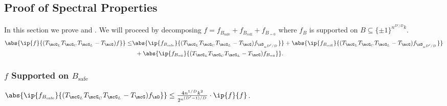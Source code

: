 \subsection{Proof of Spectral Properties}\label{sec:genspectral}

In this section we prove  and . We will proceed by decomposing $f = f_{B_{\mathrm{safe}}} + f_{B_{\mathrm{coll}}} + f_{B_{=0}}$ where $f_B$ is supported on $B \subseteq \{\pm1\}^{n^{D'/D}k}$.
\begin{align*}
    \abs{\ip{f}{(T_{\mcG_L}T_{\mcG_C}T_{\mcG_L} - T_\mcG) f}} \leq &\abs{\ip{f_{B_{\mathrm{safe}}}}{(T_{\mcG_L}T_{\mcG_C}T_{\mcG_L} - T_\mcG) f_{\sD_{n^{D'/D}}}}}
    + \abs{\ip{f_{B_{\mathrm{coll}}}}{(T_{\mcG_L}T_{\mcG_C}T_{\mcG_L} - T_\mcG) f_{\sD_{n^{D'/D}}}}}\\
    &\;\;+ \abs{\ip{f_{B_{=0}}}{(T_{\mcG_L}T_{\mcG_C}T_{\mcG_L} - T_\mcG) f_{B_{=0}}}}.
\end{align*}

\subsubsection{$f$ Supported on $B_{\mathrm{safe}}$}

\begin{lemma}
    $\abs{\ip{f_{B_{\mathrm{safe}}}}{(T_{\mcG_L}T_{\mcG_C}T_{\mcG_L} - T_\mcG) f_{\sD}}} \leq \frac{4n^{1/D}k^2}{2^{n^{(D'-1)/D}}} \cdot \ip{f}{f}$.
\end{lemma}


